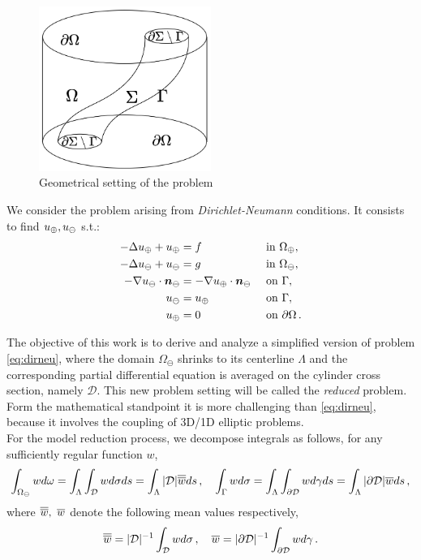 \documentclass[r]{siamart171218}
\begin{document}
\begin{figure}
\begin{center}
\includegraphics[width=0.5\textwidth]{3D-1D-simple.png}
\end{center}
\caption{Geometrical setting of the problem}
\label{fig1}
\end{figure}

We consider the problem arising from \emph{Dirichlet-Neumann} conditions. 
It consists to find $u_{\oplus},u_{\ominus}$ s.t.:
\begin{subequations}\label{eq:dirneu}
\begin{align}
\label{eq:dirneu1}
- \Delta \up  + \up &= f  && \text{ in } \Omega_{\oplus},\\
\label{eq:dirneu2}
- \Delta \uf  + \uf &= g  && \text{ in } \Omega_\ominus,\\
\label{eq:dirneu3}
-\nabla \uf \cdot \nn_{\ominus} &= -\nabla \up \cdot \nn_{\ominus}  && \text{ on } \Gamma,\\
\label{eq:dirneu4}
\uf &= \up && \text{ on }  \Gamma,\\
\label{eq:dirneu5}
\up &= 0 && \text{ on } \partial \Omega\,.
\end{align}
\end{subequations}

The objective of this work is to derive and analyze a simplified version of problem \eqref{eq:dirneu}, where the domain $\Omega_\ominus$ shrinks to its centerline $\Lambda$ and the corresponding partial differential equation is averaged on the cylinder cross section, namely $\mathcal{D}$. This new problem setting will be called the \emph{reduced} problem. Form the mathematical standpoint it is more challenging than \eqref{eq:dirneu}, because it involves the coupling of 3D/1D elliptic problems.\\

For the model reduction process, we decompose integrals as follows, for any sufficiently regular function $w$,
\begin{equation*}
\int_{\Omega_\ominus} w d\omega 
= \int_\Lambda \int_{\mathcal{D}} w d\sigma ds
= \int_\Lambda |\mathcal{D}|\overline{\overline{w}} ds\,,
\quad
\int_{\Gamma} w d\sigma 
= \int_\Lambda \int_{\partial\mathcal{D}} w d\gamma ds
= \int_\Lambda  |\partial \mathcal{D}| \overline{w} ds\,,
\end{equation*}
where $\overline{\overline{w}}, \ \overline{w}$ denote the following mean values respectively,
\begin{equation*}
\overline{\overline{w}} = |\mathcal{D}|^{-1} \int_{\mathcal{D}} w d\sigma\,,
\quad
\overline{w} = |\partial\mathcal{D}|^{-1} \int_{\partial\mathcal{D}} w d\gamma\,.
\end{equation*}
\end{document}
